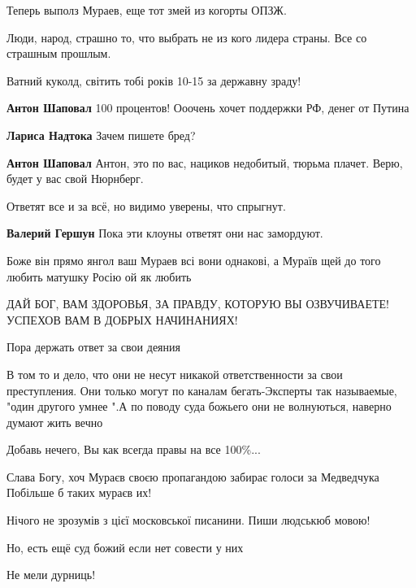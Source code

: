 \begin{itemize}
Теперь выполз Мураев, еще тот змей из когорты ОПЗЖ.

Люди, народ, страшно то, что выбрать не из кого лидера страны. Все со страшным
прошлым.

Ватний куколд, світить тобі років 10-15 за державну зраду!

\begin{itemize} %
\textbf{Антон Шаповал} 100 процентов! Ооочень хочет поддержки РФ, денег от Путина

\textbf{Лариса Надтока} Зачем пишете бред?

\textbf{Антон Шаповал} Антон, это по вас, нациков недобитый, тюрьма плачет. Верю, будет у вас свой Нюрнберг.
\end{itemize} %

Ответят все и за всё, но видимо уверены, что спрыгнут.

\begin{itemize} %
\textbf{Валерий Гершун} Пока эти клоуны ответят они нас замордуют.
\end{itemize} %

Боже він прямо янгол ваш Мураев всі вони однакові, а Мураїв щей до того любить матушку Росію ой як любить

ДАЙ БОГ, ВАМ ЗДОРОВЬЯ, ЗА ПРАВДУ, КОТОРУЮ ВЫ ОЗВУЧИВАЕТЕ! УСПЕХОВ ВАМ В ДОБРЫХ НАЧИНАНИЯХ!

Пора держать ответ за свои деяния


В том то и дело, что они не несут никакой ответственности за свои преступления.
Они только могут по каналам бегать-Эксперты так называемые, "один другого умнее
".А по поводу суда божьего они не волнуються, наверно думают жить вечно

Добавь нечего, Вы как всегда правы на все 100\%...

Слава Богу, хоч Мураєв своєю пропагандою забирає голоси за Медведчука Побільше б таких мураєв их!

Нічого не зрозумів з цієї московської писанини. Пиши людськюб мовою!

Но, есть ещё суд божий если нет совести у них

Не мели дурниць!


\end{itemize}
